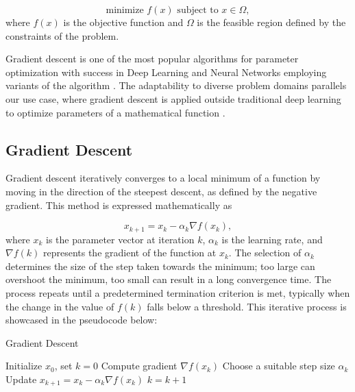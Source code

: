 \documentclass[a4paper]{report}
\begin{document}
\begin{equation}\label{optimization_problem}
	\text{minimize } f(x) \text{ subject to } x \in \Omega,
\end{equation}
where $f(x)$ is the objective function and $\Omega$ is the feasible region defined by the constraints of the problem.

Gradient descent is one of the most popular algorithms for parameter optimization with success in Deep Learning and Neural Networks employing variants of the algorithm \citep{lu2017improved, zhang2019gradient, zeebaree2019trainable}. The adaptability to diverse problem domains \citep{YingjieYugiHaibin2023SGD} parallels our use case, where gradient descent is applied outside traditional deep learning to optimize parameters of a mathematical function \citep{GradientBasedOpt2022}.

\subsection{Gradient Descent}
Gradient descent iteratively converges to a local minimum of a function by moving in the direction of the steepest descent, as defined by the negative gradient. This method is expressed mathematically as

\begin{equation}\label{GD}
    x_{k+1} = x_k - \alpha_k \nabla f(x_k),
\end{equation}
where $x_k$ is the parameter vector at iteration $k$, $\alpha_k$ is the learning rate, and $\nabla f(k)$ represents the gradient of the function at $x_k$. The selection of $\alpha_k$ determines the size of the step taken towards the minimum; too large can overshoot the minimum, too small can result in a long convergence time. The process repeats until a predetermined termination criterion is met, typically when the change in the value of $f(k)$ falls below a threshold. This iterative process is showcased in the pseudocode below:

\begin{algorithm}
\caption{Gradient Descent}
\begin{algorithmic}[1]
\State Initialize \( x_0 \), set \( k = 0 \)
    \State Compute gradient \( \nabla f(x_k) \)
    \State Choose a suitable step size \( \alpha_k \)
    \State Update \( x_{k+1} = x_k - \alpha_k \nabla f(x_k) \)
    \State \( k = k + 1 \)
\EndWhile
\end{algorithmic}
\end{algorithm}
\end{document}

